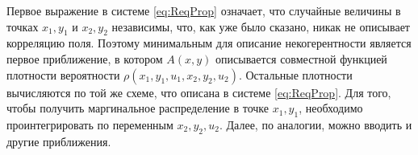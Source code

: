 Первое выражение в системе \ref{eq:ReqProp} означает, что случайные величины в точках $x_1,y_1$ и $x_2,y_2$ независимы, что, как уже было сказано, никак не описывает корреляцию поля. Поэтому минимальным для описание некогерентности является первое приближение, в котором $A(x,y)$ описывается совместной функцией плотности вероятности $\rho(x_1,y_1,u_1,x_2,y_2,u_2)$. Остальные плотности вычисляются по той же схеме, что описана в системе \ref{eq:ReqProp}. Для того, чтобы получить маргинальное распределение в точке $x_1,y_1$, необходимо проинтегрировать по переменным $x_2,y_2,u_2$. Далее, по аналогии, можно вводить и другие приближения.
